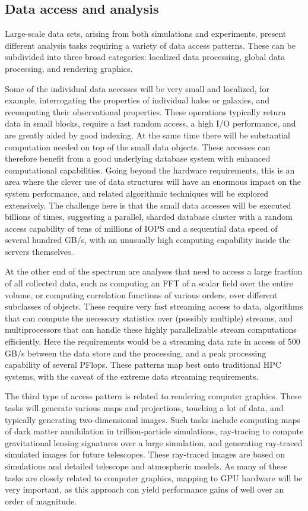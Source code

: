 \subsection{Data access and analysis}
Large-scale data sets, arising from both simulations and experiments,
present different analysis tasks requiring a variety of data access
patterns. These can be subdivided into three broad categories:
localized data processing, global data processing, and rendering
graphics.

Some of the individual data accesses will be very small and localized,
for example, interrogating the properties of individual halos or galaxies, and
recomputing their observational properties. These operations typically
return data in small blocks, require a fast random access, a high I/O
performance, and are greatly aided by good indexing. At the same time
there will be substantial computation needed on top of the small data
objects. These accesses can therefore benefit from a good underlying
database system with enhanced computational capabilities. Going beyond
the hardware requirements, this is an area where the clever use of
data structures will have an enormous impact on the system
performance, and related algorithmic techniques will be explored
extensively. The challenge here is that the small data accesses will
be executed billions of times, suggesting a parallel, sharded database
cluster with a random access capability of tens of millions of IOPS
and a sequential data speed of several hundred GB/s, with an unusually
high computing capability inside the servers themselves.

At the other end of the spectrum are analyses that need to access a
large fraction of all collected data, such as computing an FFT of a
scalar field over the entire volume, or computing correlation
functions of various orders, over different subclasses of
objects. These require very fast streaming access to data, algorithms
that can compute the necessary statistics over (possibly multiple)
streams, and multiprocessors that can handle these highly
parallelizable stream computations efficiently. Here the requirements
would be a streaming data rate in access of 500 GB/s between the data
store and the processing, and a peak processing capability of several
PFlops. These patterns map best onto traditional HPC systems, with the
caveat of the extreme data streaming requirements.

The third type of access pattern is related to rendering computer
graphics. These tasks will generate various maps and projections,
touching a lot of data, and typically generating two-dimensional
images. Such tasks include computing maps of dark matter annihilation
in trillion-particle simulations, ray-tracing to compute gravitational
lensing signatures over a large simulation, and generating ray-traced
simulated images for future telescopes. These ray-traced images are
based on simulations and detailed telescope and atmospheric models. As
many of these tasks are closely related to computer graphics, mapping
to GPU hardware will be very important, as this approach can yield
performance gains of well over an order of magnitude.

